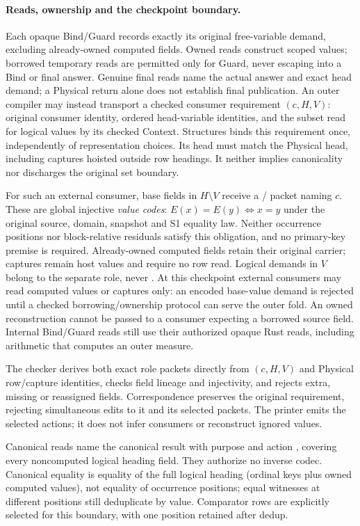 \paragraph{Reads, ownership and the checkpoint boundary.}
Each opaque Bind/Guard records exactly its original free-variable demand,
excluding already-owned computed fields. Owned reads construct scoped values;
borrowed temporary reads are permitted only for Guard, never escaping into a
Bind or final answer. Genuine final reads name the actual answer and exact
head demand; a Physical return alone does not establish final publication.
An outer compiler may instead transport a checked consumer requirement
$(c,H,V)$: original consumer identity, ordered head-variable identities, and
the subset read for logical values by its checked Context. Structures binds
this requirement once, independently of representation choices. Its head
must match the Physical head, including captures hoisted outside row headings.
It neither implies canonicality nor discharges the original set boundary.

For such an external consumer, base fields in $H\setminus V$ receive a
/ packet naming $c$. These are global
injective \emph{value codes}: $E(x)=E(y)\iff x=y$ under the original source,
domain, snapshot and S1 equality law. Neither occurrence positions nor
block-relative residuals satisfy this obligation, and no primary-key premise
is required. Already-owned computed fields retain their original carrier;
captures remain host values and require no row read. Logical demands in $V$
belong to the separate  role, never
. At this checkpoint external consumers may read
computed values or captures only: an encoded base-value demand is rejected
until a checked borrowing/ownership protocol can serve the outer fold.
An owned reconstruction cannot be passed to a consumer expecting a borrowed
source field. Internal Bind/Guard reads still use their authorized opaque
Rust reads, including arithmetic that computes an outer measure.

The checker derives both exact role packets directly from $(c,H,V)$ and
Physical row/capture identities, checks field lineage and injectivity, and
rejects extra, missing or reassigned fields. Correspondence preserves the
original requirement, rejecting simultaneous edits to it and its selected
packets. The printer emits the selected actions; it does not infer consumers
or reconstruct ignored values.

Canonical reads name the canonical result with purpose
 and action , covering every noncomputed
logical heading field. They authorize no inverse codec. Canonical equality is
equality of the full logical heading (ordinal keys plus owned computed values),
not equality of occurrence positions; equal witnesses at different positions
still deduplicate by value. Comparator rows are explicitly selected for this
boundary, with one position retained after dedup.

